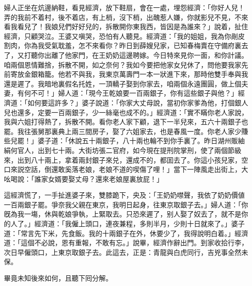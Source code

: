 婦人正坐在炕邊納鞋，看見經濟，放下鞋扇，會在一處，埋怨經濟：「你好人兒！弄的我前不着村，後不着店，有上梢，沒下梢，出醜惹人嫌，你就影兒不見，不來看我看兒了！我娘兒們好好兒的，拆散開你東我西，皆因是為誰來？」說着，扯住經濟，只顧哭泣。王婆又嗔哭，恐怕有人聽見。經濟道：「我的姐姐，我為你剮皮割肉，你為我受氣耽羞，怎不來看你？昨日到薛嫂兒家，已知春梅賣在守備府裏去了，又打聽你出離了他家門，在王奶奶這邊聘嫁。今日特來見你一面，和你計議。咱兩個恩情難捨，拆散不開，如之奈何？我如今要把他家女兒休了，問他要我家先前寄放金銀箱籠。他若不與我，我東京萬壽門一本一狀進下來，那時他雙手奉與我還是遲了。我暗地裏假名托姓，一頂轎子娶到你家去，咱兩個永遠團圓，做上個夫妻，有何不可！」婦人道：「現今王乾娘要一百兩銀子，你有這些銀子與他？」經濟道：「如何要這許多？」婆子說道：「你家大丈母說，當初你家爹為他，打個銀人兒也還多，定要一百兩銀子，少一絲毫也成不的。」經濟道：「實不瞞你老人家說，我與六姐打得熱了，拆散不開。看你老人家下顧，退下一半兒來，五六十兩銀子也罷。我往張舅那裏典上兩三間房子，娶了六姐家去，也是春風一度。你老人家少賺些兒罷！」婆子道：「休說五十兩銀子，八十兩也輪不到你手裏了。昨日湖州販紬絹何官人，出到七十兩。大街坊張二官府，如今現在提刑院掌刑，使了兩個節級來，出到八十兩上，拿着兩封銀子來兑，還成不的，都囬去了。你這小孩兒家，空口來説空話，倒還敢奚落老娘，老娘不道的喫傷了哩！」當下一陣風走出街上，大吆喝說：「誰家女婿要娶丈母？還來老娘屋裏放屁！」

這經濟慌了，一手扯進婆子來，雙膝跪下，央及：「王奶奶噤聲，我依了奶奶價値一百兩銀子罷。爭奈我父親在東京，我明日起身，往東京取銀子去。」婦人道：「你旣為我一塲，休與乾娘爭執，上緊取去。只恐來遲了，别人娶了奴去了，就不是你的人了。」經濟道：「我僱上頭口，連夜兼程，多則半月，少則十日就來了。」婆子道：「常言先下米，先食飯。我的十兩銀子在外，休要少了，我得說明白着。」經濟道：「這個不必說，恩有重報，不敢有忘。」說畢，經濟作辭出門。到家收拾行李，次日早僱頭口，上東京取銀子去。此這去，正是：青龍與白虎同行，吉兇事全然未保。

畢竟未知後來如何，且聽下囘分解。

